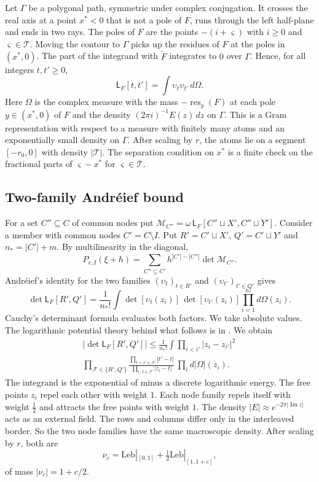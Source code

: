\documentclass[11pt]{amsart}
\theoremstyle{definition}
\theoremstyle{remark}
\numberwithin{equation}{section}
\renewcommand{\Im}{\operatorname{Im}}
\newcommand{\Lw}{\mathsf L}          %
\begin{document}
Let $\Gamma$ be a polygonal path, symmetric under complex conjugation. It crosses the real axis at a point $x^*<0$ that
is not a pole of $F$, runs through the left half-plane and ends in two rays. The poles of $F$ are the points
$-(i+\varsigma)$ with $i\ge0$ and $\varsigma\in\mathcal T$. Moving the contour to $\Gamma$ picks up the residues of $F$
at the poles in $(x^*,0)$. The part of the integrand with $\tilde F$ integrates to $0$ over $\Gamma$. Hence, for all
integers $t,t'\ge0$,
\begin{equation}\label{eq:gram}
 \Lw_F[t,t']=\int\upsilon_t\upsilon_{t'}\,d\Omega .
\end{equation}
Here $\Omega$ is the complex measure with the mass $-\operatorname{res}_y(F)$ at each pole $y\in(x^*,0)$ of $F$ and the
density $(2\pi i)^{-1}E(z)\,dz$ on $\Gamma$. This is a Gram representation with respect to a measure with finitely many
atoms and an exponentially small density on $\Gamma$. After scaling by $r$, the atoms lie on a segment $[-r_0,0]$ with
density $|\mathcal T|$. The separation condition on $x^*$ is a finite check on the fractional parts of $\varsigma-x^*$
for $\varsigma\in\mathcal T$.

\subsection{Two-family Andr\'eief bound}
For a set $C''\subseteq C$ of common nodes put $\mathcal M_{C''}=\omega\,\Lw_F[C''\sqcup X',C''\sqcup Y']$. Consider a
member with common nodes $C'=C\setminus I$. Put $R'=C'\sqcup X'$, $Q'=C'\sqcup Y'$ and $n_*=|C'|+m$. By multilinearity in
the diagonal,
\begin{equation}\label{eq:expand}
 P_{r,I}(\xi+h)=\sum_{C''\subseteq C'}h^{|C'|-|C''|}\det\mathcal M_{C''} .
\end{equation}
Andr\'eief's identity \cite{Forrester2018Andreief} for the two families $(\upsilon_t)_{t\in R'}$ and
$(\upsilon_{t'})_{t'\in Q'}$ gives
\[
 \det\Lw_F[R',Q']=\frac1{n_*!}\int\det[\upsilon_t(z_i)]\,\det[\upsilon_{t'}(z_i)]\prod_{i=1}^{n_*}d\Omega(z_i).
\]
Cauchy's determinant formula evaluates both factors. We take absolute values. The logarithmic potential theory behind
what follows is in \cite{SaffTotik}. We obtain
\begin{multline*}
 |\det\Lw_F[R',Q']|\le\frac1{n_*!}\int\prod_{i<i'}|z_i-z_{i'}|^2\,\\
 \prod_{\mathcal F\in\{R',Q'\}}\frac{\prod_{t<t'\in\mathcal F}|t'-t|}{\prod_{i,\,t\in\mathcal F}|z_i-t|}\
 \prod_id|\Omega|(z_i).
\end{multline*}
The integrand is the exponential of minus a discrete logarithmic energy. The free points $z_i$ repel each other with
weight $1$. Each node family repels itself with weight $\frac12$ and attracts the free points with weight $1$. The
density $|E|\approx e^{-2\pi|\Im z|}$ acts as an external field. The rows and columns differ only in the interleaved
border. So the two node families have the same macroscopic density. After scaling by $r$, both are
\[
 \nu_c=\mathrm{Leb}|_{[0,1]}+\tfrac12\mathrm{Leb}|_{[1,1+c]},
\]
of mass $|\nu_c|=1+c/2$.
\end{document}
